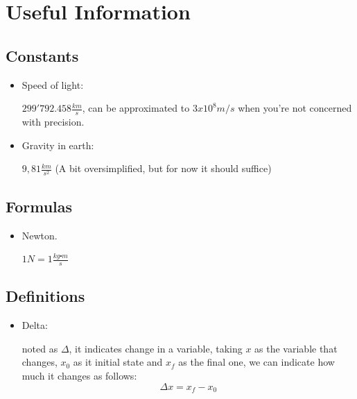 \documentclass[11pt,fleqn]{book} %
\begin{document}
\chapter{Useful Information}

\section{Constants}
\begin{itemize}

    \item Speed of light: 
    
    $299'792.458 \frac{km}{s}$, can be approximated to $ 3x10^8 m/s $ when you're not concerned with precision.

    \item Gravity in earth: 
    
    $ 9,81 \frac{km}{s^2}$ (A bit oversimplified, but for now it should suffice)

\end{itemize}
\section{Formulas}
\begin{itemize}
    \item Newton.
    
    $ 1N = 1 \frac{kg \centerdot m}{s} $
\end{itemize}
\section{Definitions}
\begin{itemize}
    \item Delta: 
    
    noted as $ \Delta $, it indicates change in a variable, taking $ x $ as the variable
    that changes, $ x_0 $ as it initial state and $ x_f $ as the final one, we can indicate how much it
    changes as follows: $$ \Delta x = x_f - x_0 $$
\end{itemize}



\end{document}
